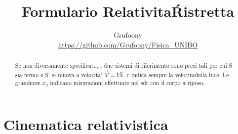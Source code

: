 \documentclass[a4paper]{article}
\begin{document}
	\title{Formulario Relativita\' Ristretta}
	\author{Grufoony\\\url{https://github.com/Grufoony/Fisica_UNIBO}}
	\maketitle
    \begin{abstract}
        Se non diversamente specificato, i due sistemi di riferimento sono presi tali per cui S sia fermo e S' si muova a velocita\' $\vec{V}=V\hat{x}$.
        c indica sempre la velocita\' della luce. Le grandezze $x_0$ indicano misurazioni effettuate nel sdr con il corpo a riposo.
    \end{abstract}
    \section{Cinematica relativistica}
\end{document}
